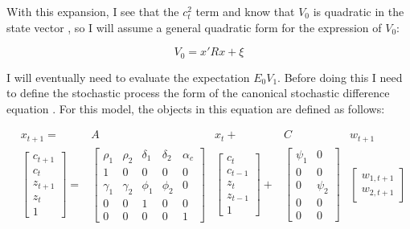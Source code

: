 \documentclass{homework}
\begin{document}
\begin{homeworkProblem}[Problem 2.5]
{\begin{enumerate}[a.]
        With this expansion, I see that the $c_t^2$ term and know that  $V_0$ is quadratic in the state vector , so I will assume a general quadratic form for the expression of $V_0$:

        $$ V_0 = x'Rx + \xi $$

        I will eventually need to evaluate the expectation $E_0 V_1$. Before doing this I need to define the stochastic process the form of the canonical stochastic difference equation . For this model, the objects in this equation are defined as follows:

        \begin{align*}
          &x_{t+1} = &A &x_t + &C &w_{t+1} \\
          &\left[\begin{matrix} c_{t+1} \\ c_{t} \\ z_{t+1} \\ z_{t} \\ 1 \end{matrix}\right] =
            &\begin{bmatrix}  %
             \rho_1 & \rho_2 & \delta_1 & \delta_2 &  \alpha_c \\
             1 & 0 & 0 & 0 & 0 \\
             \gamma_1 & \gamma_2 & \phi_1 & \phi_2 & 0 \\
             0 & 0 & 1 & 0 & 0 \\
             0 & 0 & 0 & 0 & 1
             \end{bmatrix}
             &\left[\begin{matrix} c_t \\ c_{t-1} \\ z_t \\ z_{t-1} \\ 1 \end{matrix}\right] %
             +
             &\begin{bmatrix} %
             \psi_1 & 0 \\
             0 & 0 \\
            0 & \psi_2 \\
            0 & 0 \\
            0 & 0
            \end{bmatrix}
            &\begin{bmatrix} %
              w_{1, t+1}\\
              w_{2, t+1}
            \end{bmatrix}
        \end{align*}


\end{enumerate}}
\end{homeworkProblem}
\end{document}
